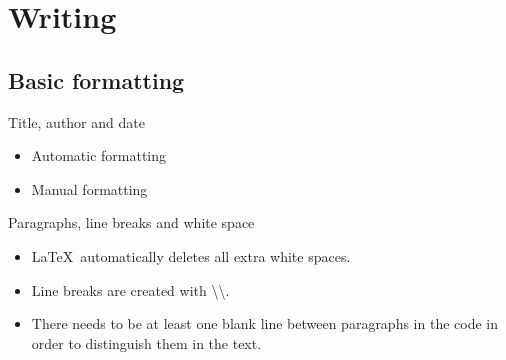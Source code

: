 \section{Writing}

\subsection{Basic formatting}

\begin{frame}[fragile]{Title, author and date}
	\begin{itemize}
		\item Automatic formatting
		\item Manual formatting
	\end{itemize}
\end{frame}

\begin{frame}[c]{Paragraphs, line breaks and white space}
	\begin{itemize}
		\item \LaTeX\ automatically deletes all extra white spaces.
		\item Line breaks are created with \textbackslash\textbackslash.
		\item There needs to be at least one blank line between paragraphs in
			the code in order to distinguish them in the text.
	\end{itemize}
\end{frame}

